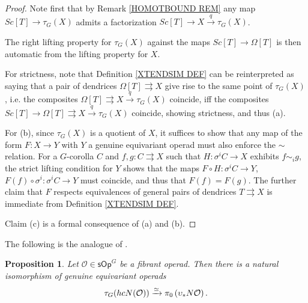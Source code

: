 \documentclass[a4paper,10pt
,draft
]{article}%
\numberwithin{equation}{section}
\numberwithin{figure}{section}
\newtheorem{proposition}[equation]{Proposition}%
\theoremstyle{definition} %
\newcommand{\1}{\ensuremath{\mathbbm 1}}%
\begin{document}
\begin{proof}
        Note first that by Remark \ref{HOMOTBOUND REM}
	any map $Sc[T] \to \tau_G(X)$ admits a factorization 
	$Sc[T] \to X \xrightarrow{q} \tau_G(X)$.
	
	The right lifting property for $\tau_G(X)$
	against the maps $Sc[T] \to \Omega[T]$
	is then automatic from the lifting property for $X$.

	For strictness,	
	note that Definition \ref{XTENDSIM DEF}
	can be reinterpreted as saying that
	a pair of dendrices $\Omega[T] \rightrightarrows X$
	give rise to the same point of 
	$\tau_G(X)$, i.e. 
	the composites 
	$\Omega[T] \rightrightarrows X \xrightarrow{q}
	\tau_G(X)$ coincide, 
	iff the composites 
	$Sc[T] \to \Omega[T] \rightrightarrows X \xrightarrow{q}
	\tau_G(X)$ coincide, showing strictness, and thus (a).
		
	For (b), since $\tau_G(X)$ is a quotient of
	$X$, it suffices to show that any map
	of the form $F \colon X \to Y$ with $Y$ a genuine equivariant operad must also enforce the $\sim$ relation.
	For a $G$-corolla $C$ and
	$f,g\colon C \rightrightarrows X$ such that 
	$H \colon \sigma^i C \to X$ exhibits
	$f \sim_i g$, 
	the strict lifting condition for $Y$
	shows that the maps
	$F\circ H \colon \sigma^i C \to Y$,
	$F(f) \circ \sigma^i \colon \sigma^i C \to Y$
	must coincide, and thus that
	$F(f)=F(g)$.
	The further claim that $F$ respects equivalences
	of general pairs of dendrices $T \rightrightarrows X$
	is immediate from Definition \ref{XTENDSIM DEF}.

        Claim (c) is a formal consequence of (a) and (b).
\end{proof}




The following is the analogue of \cite[Prop. 4.8]{CM13b}.

\begin{proposition}\label{HOOPID_PROP}
Let $\mathcal{O} \in \mathsf{sOp}^G$
be a fibrant operad. 
Then there is a natural isomorphism of genuine equivariant operads
\begin{equation}\label{HOOPID EQ}
\tau_G(hcN(\mathcal{O})) \xrightarrow{\simeq}
\pi_0 \left( \upsilon_{\**} N\mathcal{O} \right).
\end{equation}
\end{proposition}
\end{document}
